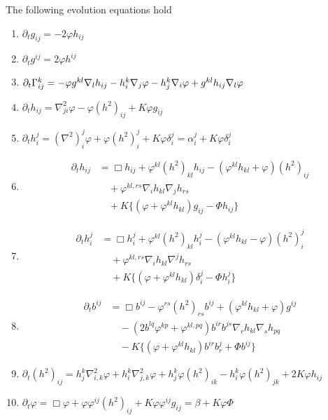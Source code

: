 \documentclass{amsart}
\begin{document}
\begin{lemma}
\label{lem:evolution}
The following evolution equations hold
\begin{enumerate}
\item \label{eq:delt_metric} $\partial_tg_{ij} = -2\varphi h_{ij}$
\item \label{eq:delt_inversemetric} $\partial_t g^{ij} = 2\varphi h^{ij}$
\item \label{eq:delt_christoffel} $\partial_t {\Gamma}^{k}_{ij} = -\varphi g^{kl} \nabla_l h_{ij} - h^k_i \nabla_j \varphi - h^k_j \nabla_i \varphi + g^{kl} h_{ij} \nabla_l \varphi$
\item \label{eq:delt_sff} $\partial_t h_{ij} = \nabla^2_{ji} \varphi - \varphi(h^2)_{ij} + K \varphi g_{ij}$
\item \label{eq:delt_weingarten} $\partial_t h_i^j = (\nabla^2)^j_i\varphi + \varphi(h^2)_i^j + K \varphi\delta_i^j = \alpha^j_i + K \varphi\delta_i^j$
\item \label{eq:delt_sff_box} \begin{align*}
\partial_t h_{ij} &= \Box h_{ij} + \varphi^{kl} (h^2)_{kl} h_{ij} - (\varphi^{kl}h_{kl} + \varphi) (h^2)_{ij} \\
& \quad + \varphi^{kl,rs}\nabla_i h_{kl}\nabla_j h_{rs} \\
& \quad + K \{(\varphi + \varphi^{kl}h_{kl}) g_{ij} - \Phi h_{ij}\}
\end{align*}
\item \label{eq:delt_weingarten_box} \begin{align*}
\partial_t h_i^j &= \Box h_i^j + \varphi^{kl} (h^2)_{kl} h_i^j - (\varphi^{kl}h_{kl} - \varphi) (h^2)_i^j \\
& \quad + \varphi^{kl,rs}\nabla_i h_{kl}\nabla^j h_{rs} \\
& \quad + K \{(\varphi + \varphi^{kl}h_{kl}) \delta_i^j - \Phi h_i^j\}
\end{align*}
\item \label{eq:delt_inversesff} \begin{align*}
\partial_t b^{ij} &= \Box b^{ij} - \varphi^{rs} (h^2)_{rs} b^{ij} + (\varphi^{kl}h_{kl} + \varphi) g^{ij} \\  
& \quad - \left(2b^{lq}\varphi^{kp} + \varphi^{kl,pq}\right) b^{ir}b^{js} \nabla_r h_{kl} \nabla_s h_{pq} \\
& \quad - K \{(\varphi + \varphi^{kl}h_{kl}) b^{ir}b^{j}_{r} + \Phi b^{ij}\}
\end{align*}
\item \label{eq:delt_squaredsff} $\partial_t (h^2)_{ij} = h^k_j \nabla^2_{i,k} \varphi + h^k_i \nabla^2_{j,k} \varphi + h^k_j \varphi(h^2)_{ik} - h^k_i \varphi(h^2)_{jk} + 2K\varphi h_{ij}$
\item \label{eq:delt_speed} $\partial_t \varphi = \Box \varphi + \varphi\varphi^{ij}(h^2)_{ij} + K \varphi\varphi^{ij}g_{ij} = \beta + K\varphi\Phi$
\end{enumerate}
\end{lemma}
\end{document}
